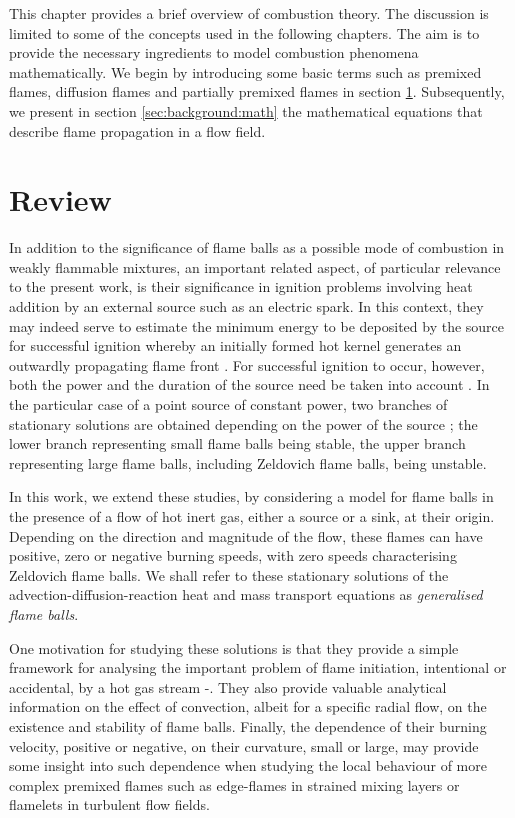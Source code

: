 This chapter provides a brief overview of combustion theory. The discussion is limited to some of the concepts used in the following chapters. The aim is to provide the necessary ingredients to model combustion phenomena mathematically. We begin by introducing some basic terms such as premixed flames, diffusion flames and partially premixed flames in section \ref{sec:background:classifications}. Subsequently, we present in section \ref{sec:background:math} the mathematical equations that describe flame propagation in a flow field.

\section{Review}\label{sec:background:classifications}


In addition to the significance of flame balls as a possible mode of combustion in weakly flammable mixtures,
an important related aspect, of particular relevance to the present work, is their significance  in ignition problems involving heat addition  by  an external source  such  as an electric spark. In this context, they may indeed serve to estimate the minimum energy to be deposited by the source for successful ignition whereby an initially formed  hot kernel   generates an outwardly propagating  flame front \cite[p.~331]{zeldovitch_math_theory}. For successful ignition to occur, however, both the power and the duration of the source need   be taken into account \cite{Joulin1,Joulin2,Joulin4}. In the particular case of a point source of constant power, two branches of stationary solutions are obtained depending on the power of the source \cite{Joulin1}; the lower branch representing small flame balls  being stable, the upper branch  representing large flame balls, including  Zeldovich flame balls, being unstable.

In this work, we extend these studies, by considering a model for flame balls in the presence of a flow of hot inert gas, either a source or a sink, at their origin. Depending on the direction and magnitude of the flow, these flames
can have positive, zero or negative burning speeds, with zero  speeds characterising  Zeldovich  flame balls. We shall refer to these stationary solutions of the advection-diffusion-reaction heat and mass transport equations as   \emph{generalised flame balls}.

One motivation for studying these solutions is that they provide a simple framework  for analysing the important problem of flame initiation, intentional or accidental, by a hot gas stream \cite[p.~265]{williams_combustion_Theory}-\cite{Sadanandan}.  They also provide valuable analytical information on the effect of convection, albeit for a specific radial flow,  on the existence and stability of flame balls. Finally, the dependence of their burning velocity, positive or negative, on their curvature, small or large,  may provide some insight into such dependence  when studying the local behaviour of more complex premixed flames such as edge-flames in strained mixing layers or flamelets in    turbulent flow fields.

